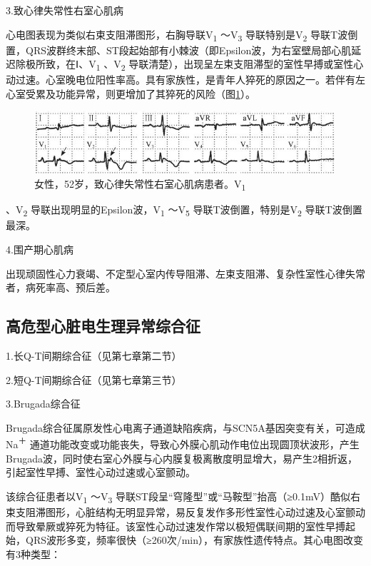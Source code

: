 3.致心律失常性右室心肌病

心电图表现为类似右束支阻滞图形，右胸导联V\textsubscript{1}
～V\textsubscript{3} 导联特别是V\textsubscript{2}
导联T波倒置，QRS波群终末部、ST段起始部有小棘波（即Epsilon波，为右室壁局部心肌延迟除极所致，在Ⅰ、V\textsubscript{1}
、V\textsubscript{2}
导联清楚），出现呈左束支阻滞型的室性早搏或室性心动过速。心室晚电位阳性率高。具有家族性，是青年人猝死的原因之一。若伴有左心室受累及功能异常，则更增加了其猝死的风险（图\ref{fig34-9}）。

\begin{figure}[!htbp]
 \centering
 \includegraphics[width=4.40625in,height=0.91667in]{./images/Image00549.jpg}
 \captionsetup{justification=centering}
 \caption{女性，52岁，致心律失常性右室心肌病患者。V\textsubscript{1}}
 \label{fig34-9}
  \end{figure} 
、V\textsubscript{2} 导联出现明显的Epsilon波，V\textsubscript{1}
～V\textsubscript{5} 导联T波倒置，特别是V\textsubscript{2}
导联T波倒置最深。

4.围产期心肌病

出现顽固性心力衰竭、不定型心室内传导阻滞、左束支阻滞、复杂性室性心律失常者，病死率高、预后差。

\protect\hypertarget{text00041.htmlux5cux23subid451}{}{}

\subsection{高危型心脏电生理异常综合征}

1.长Q-T间期综合征（见第七章第二节）

2.短Q-T间期综合征（见第七章第三节）

3.Brugada综合征

Brugada综合征属原发性心电离子通道缺陷疾病，与SCN5A基因突变有关，可造成Na\textsuperscript{＋}
通道功能改变或功能丧失，导致心外膜心肌动作电位出现圆顶状波形，产生Brugada波，同时使右室心外膜与心内膜复极离散度明显增大，易产生2相折返，引起室性早搏、室性心动过速或心室颤动。

该综合征患者以V\textsubscript{1} ～V\textsubscript{3}
导联ST段呈“穹隆型”或“马鞍型”抬高（≥0.1mV）酷似右束支阻滞图形，心脏结构无明显异常，易反复发作多形性室性心动过速及心室颤动而导致晕厥或猝死为特征。该室性心动过速发作常以极短偶联间期的室性早搏起始，QRS波形多变，频率很快（≥260次/min），有家族性遗传特点。其心电图改变有3种类型：

